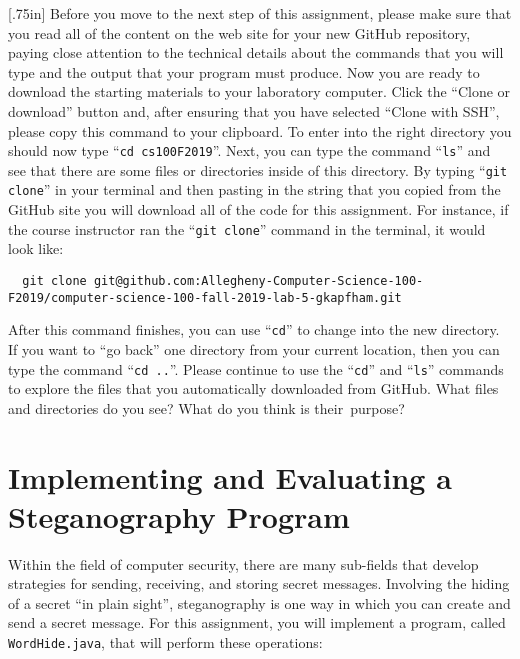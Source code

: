 \documentclass[11pt]{article}
\newcommand{\command}[1]{``\lstinline{#1}''}
\newcommand{\step}[1]{``{#1}''}
\newcommand{\caution}[1]{\null\hfill\LARGE{\faWarning{}}\newline\scriptsize{\em{#1}}}
\begin{document}
\marginnote{\caution{Clone GitHub repository}}[.75in] Before you move to the
next step of this assignment, please make sure that you read all of the content
on the web site for your new GitHub repository, paying close attention to the
technical details about the commands that you will type and the output that your
program must produce. Now you are ready to download the starting materials to
your laboratory computer. Click the ``Clone or download'' button and, after
ensuring that you have selected ``Clone with SSH'', please copy this command to
your clipboard. To enter into the right directory you should now type
\command{cd cs100F2019}. Next, you can type the command \command{ls} and see
that there are some files or directories inside of this directory. By typing
\command{git clone} in your terminal and then pasting in the string that you
copied from the GitHub site you will download all of the code for this
assignment. For instance, if the course instructor ran the \command{git clone}
command in the terminal, it would look like:

\begin{lstlisting}
  git clone git@github.com:Allegheny-Computer-Science-100-F2019/computer-science-100-fall-2019-lab-5-gkapfham.git
\end{lstlisting}

After this command finishes, you can use \command{cd} to change into the new
directory. If you want to \step{go back} one directory from your current
location, then you can type the command \command{cd ..}. Please continue to use
the \command{cd} and \command{ls} commands to explore the files that you
automatically downloaded from GitHub. What files and directories do you see?
What do you think is \mbox{their purpose}?


\section*{Implementing and Evaluating a Steganography Program}

Within the field of computer security, there are many sub-fields that develop
strategies for sending, receiving, and storing secret messages. Involving the
hiding of a secret ``in plain sight'', steganography is one way in which you can
create and send a secret message. For this assignment, you will implement a
program, called {\tt WordHide.java}, that will perform these operations:
\end{document}
